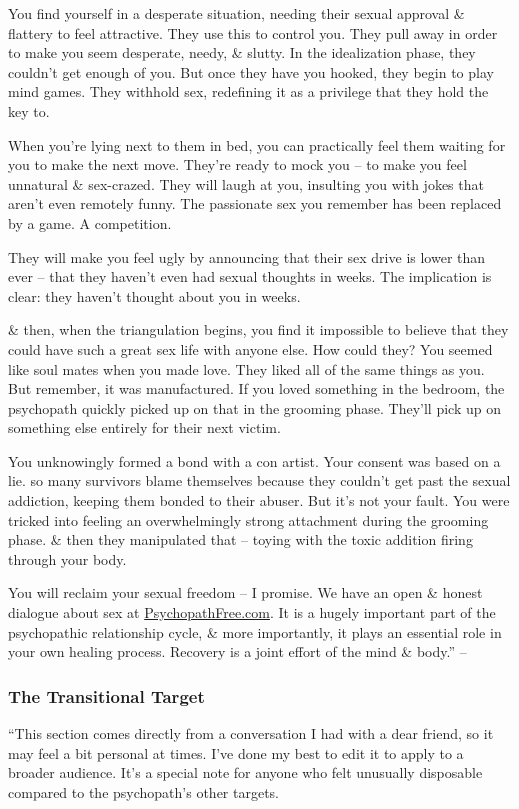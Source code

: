 \documentclass{article}
\numberwithin{equation}{section}
\begin{document}
You find yourself in a desperate situation, needing their sexual approval \& flattery to feel attractive. They use this to control you. They pull away in order to make you seem desperate, needy, \& slutty. In the idealization phase, they couldn't get enough of you. But once they have you hooked, they begin to play mind games. They withhold sex, redefining it as a privilege that they hold the key to.

When you're lying next to them in bed, you can practically feel them waiting for you to make the next move. They're ready to mock you -- to make you feel unnatural \& sex-crazed. They will laugh at you, insulting you with jokes that aren't even remotely funny. The passionate sex you remember has been replaced by a game. A competition.

They will make you feel ugly by announcing that their sex drive is lower than ever -- that they haven't even had sexual thoughts in weeks. The implication is clear: they haven't thought about you in weeks.

\& then, when the triangulation begins, you find it impossible to believe that they could have such a great sex life with anyone else. How could they? You seemed like soul mates when you made love. They liked all of the same things as you. But remember, it was manufactured. If you loved something in the bedroom, the psychopath quickly picked up on that in the grooming phase. They'll pick up on something else entirely for their next victim.

You unknowingly formed a bond with a con artist. Your consent was based on a lie. so many survivors blame themselves because they couldn't get past the sexual addiction, keeping them bonded to their abuser. But it's not your fault. You were tricked into feeling an overwhelmingly strong attachment during the grooming phase. \& then they manipulated that -- toying with the toxic addition firing through your body.

You will reclaim your sexual freedom -- I promise. We have an open \& honest dialogue about sex at \url{PsychopathFree.com}. It is a hugely important part of the psychopathic relationship cycle, \& more importantly, it plays an essential role in your own healing process. Recovery is a joint effort of the mind \& body.'' -- \cite[pp. 48--50]{MacKenzie2015}

\subsubsection{The Transitional Target}
``This section comes directly from a conversation I had with a dear friend, so it may feel a bit personal at times. I've done my best to edit it to apply to a broader audience. It's a special note for anyone who felt unusually disposable compared to the psychopath's other targets.
\end{document}
